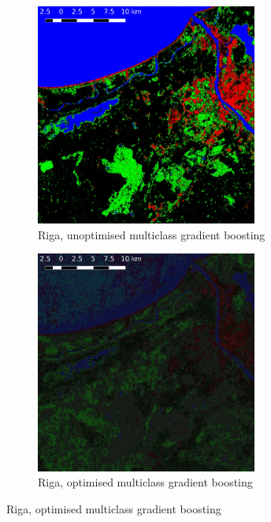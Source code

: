 \documentclass[a4paper,12pt]{scrbook}
\begin{document}
\begin{figure}
  \centering
  \begin{subfigure}[b]{0.48\textwidth}
    \centering
    \includegraphics[width=0.8\textwidth]{thesis-figures/figures-qgis/riga-gbu}
    \caption{Riga, unoptimised multiclass gradient boosting}
  \end{subfigure} \hfill
  \begin{subfigure}[b]{0.48\textwidth}
    \centering
    \includegraphics[width=0.8\textwidth]{thesis-figures/figures-qgis/riga-gbo}
    \caption{Riga, optimised multiclass gradient boosting}
  \end{subfigure}

\end{figure}
\end{document}
